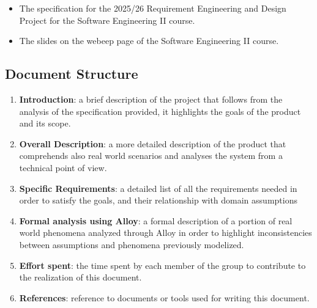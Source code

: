 \begin{itemize}
    \item The specification for the 2025/26 Requirement Engineering and Design Project for the Software Engineering II course.
    \item The slides on the webeep page of the Software Engineering II course.
\end{itemize}

\subsection{Document Structure}

\begin{enumerate}
    \item \textbf{Introduction}: a brief description of the project that follows from the analysis of the specification provided, it highlights the goals of the product and its scope.
    \item \textbf{Overall Description}: a more detailed description of the product that comprehends also real world scenarios and analyses the system from a technical point of view.
    \item \textbf{Specific Requirements}: a detailed list of all the requirements needed in order to satisfy the goals, and their relationship with domain assumptions
    \item \textbf{Formal analysis using Alloy}: a formal description of a portion of real world phenomena analyzed through Alloy in order to highlight inconsistencies between assumptions and phenomena previously modelized.
    \item \textbf{Effort spent}: the time spent by each member of the group to contribute to the realization of this document.
    \item \textbf{References}: reference to documents or tools used for writing this document.
\end{enumerate}